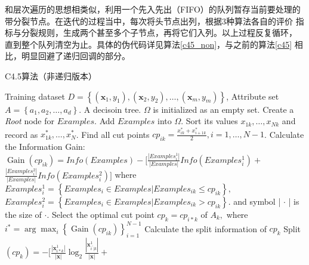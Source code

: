\documentclass[main.tex]{subfiles}
\begin{document}
和层次遍历的思想相类似，利用一个先入先出（FIFO）的队列暂存当前要处理的
带分裂节点。在迭代的过程当中，每次将头节点出列，根据3种算法各自的评价
指标与分裂规则，生成两个甚至多个子节点，再将它们入列。以上过程反复循环，
直到整个队列清空为止。具体的伪代码详见算法\ref{c45_non}，与之前的算法\ref{c45}
相比，明显回避了递归回调的部分。

\begin{algorithm}
    \caption{C4.5算法（非递归版本）}
    \label{c45_non}
    \begin{algorithmic}[1] %
        \Require
        Training dataset $D=\left\{\left(\boldsymbol{x}_{1}, y_{1}\right),\left(\boldsymbol{x}_{2}, y_{2}\right), \ldots,\left(\boldsymbol{x}_{m}, y_{m}\right)\right\}$,
        Attribute set $A=\left\{a_{1}, a_{2}, \dots, a_{d}\right\}$.
        \Ensure A decisoin tree.
            \State $\Omega$ is initialized as an empty set.
            \State Create a \textit{Root} node for $Examples$.
            \State Add $Examples$ into $\Omega$.
                    \State Sort its values $x_{1 k}, \ldots, x_{N k}$ and record as $x_{1 k}^{*}, \ldots, x_{N}^{*}$.
                    \State Find all cut points $c p_{i k}=\frac{x_{i k}^{*}+x_{i+1 k}^{*}}{2}, i=1, \ldots, N-1$.
                        \State Calculate the Information Gain:
                        \State $\operatorname{Gain}\left(c p_{i k}\right)=Info(Examples)-[\frac{\left|Examples_{i}^{1}\right|}{|Examples|} Info\left(Examples_{i}^{1}\right)+$
                        \State $\frac{\left|Examples_{i}^{2}\right|}{|Examples|} Info\left(Examples_{i}^{2}\right)]$
                        \State where
                        \State $Examples_{i}^{1}=\left\{Examples_{i} \in {Examples} | Examples_{i k} \leq c p_{i k}\right\}, $
                        \State $Examples_{i}^{2}=\left\{Examples_{i} \in {Examples} | Examples_{i k}>c p_{i k}\right\}$.
                        \State and symbol | $\cdot$ | is the size of $\cdot$.
                    \EndFor
                    \State Select the optimal cut point $c p_{k}=c p_{i * k}$ of $A_{k},$ where
                    \State $i^{*}=\arg \max _{i}\left\{\operatorname{Gain}\left(c p_{i k}\right)\right\}_{i=1}^{N-1}$
                    \State Calculate the split information of $c p_{k}$
                    \State Split $\left(c p_{k}\right)=-[\frac{\left|\mathbf{x}_{i * k}^{1}\right|}{|\mathbf{x}|} \log _{2} \frac{\left|\mathbf{x}_{i^{\prime} | k}^{1}\right|}{|\mathbf{x}|}+$

\end{algorithmic}
\end{algorithm}
\end{document}
